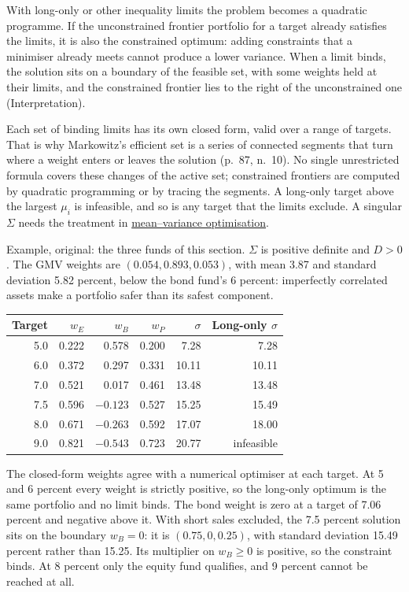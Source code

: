 \begin{qfmethod}
With long-only or other inequality limits the problem becomes a quadratic programme. If the unconstrained frontier portfolio for a target already satisfies the limits, it is also the constrained optimum: adding constraints that a minimiser already meets cannot produce a lower variance. When a limit binds, the solution sits on a boundary of the feasible set, with some weights held at their limits, and the constrained frontier lies to the right of the unconstrained one (Interpretation).

Each set of binding limits has its own closed form, valid over a range of targets. That is why Markowitz's efficient set is a series of connected segments that turn where a weight enters or leaves the solution (p.~87, n.~10). No single unrestricted formula covers these changes of the active set; constrained frontiers are computed by quadratic programming or by tracing the segments. A long-only target above the largest $\mu_i$ is infeasible, and so is any target that the limits exclude. A singular $\Sigma$ needs the treatment in \hyperref[mod:mean-variance-portfolio-optimisation]{mean--variance optimisation}.

 Example, original: the three funds of this section. $\Sigma$ is positive definite and $D>0$. The GMV weights are $(0.054,0.893,0.053)$, with mean 3.87 and standard deviation 5.82 percent, below the bond fund's 6 percent: imperfectly correlated assets make a portfolio safer than its safest component.

\begin{center}\small
\begin{tabular}{@{}rrrrrr@{}}
\toprule
Target & $w_E$ & $w_B$ & $w_P$ & $\sigma$ & Long-only $\sigma$ \\
\midrule
5.0 & 0.222 & 0.578 & 0.200 & 7.28 & 7.28 \\
6.0 & 0.372 & 0.297 & 0.331 & 10.11 & 10.11 \\
7.0 & 0.521 & 0.017 & 0.461 & 13.48 & 13.48 \\
7.5 & 0.596 & $-0.123$ & 0.527 & 15.25 & 15.49 \\
8.0 & 0.671 & $-0.263$ & 0.592 & 17.07 & 18.00 \\
9.0 & 0.821 & $-0.543$ & 0.723 & 20.77 & infeasible \\
\bottomrule
\end{tabular}
\end{center}

The closed-form weights agree with a numerical optimiser at each target. At 5 and 6 percent every weight is strictly positive, so the long-only optimum is the same portfolio and no limit binds. The bond weight is zero at a target of 7.06 percent and negative above it. With short sales excluded, the 7.5 percent solution sits on the boundary $w_B=0$: it is $(0.75,0,0.25)$, with standard deviation 15.49 percent rather than 15.25. Its multiplier on $w_B\ge0$ is positive, so the constraint binds. At 8 percent only the equity fund qualifies, and 9 percent cannot be reached at all.


\end{qfmethod}
